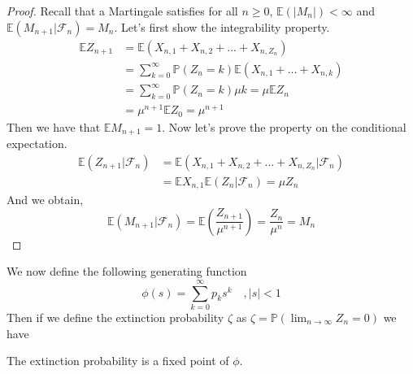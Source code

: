 \begin{proof}
	Recall that a Martingale satisfies for all $n\geq0$, $\mathbb{E}(|M_n|) < \infty$ and $\mathbb{E}(M_{n+1} | \mathcal{F}_n) = M_n$.
	Let's first show the integrability property.
	\begin{align}
		\mathbb{E}Z_{n+1} 	&= \mathbb{E}(X_{n,1} + X_{n,2} + ... + X_{n, Z_n}) \\
					&= \sum_{k=0}^{\infty} \mathbb{P}(Z_n = k)\mathbb{E}(X_{n,1} + ... + X_{n,k})\\
					&= \sum_{k=0}^{\infty} \mathbb{P}(Z_n = k) \mu k = \mu \mathbb{E}Z_n \\
					&= \mu ^{n+1} \mathbb{E} Z_0 = \mu^{n+1}
	\end{align}
	Then we have that $\mathbb{E}M_{n+1} = 1$.
	\newline
	Now let's prove the property on the conditional expectation.
	\begin{align}
		\mathbb{E}(Z_{n+1} | \mathcal{F}_n) 	&= \mathbb{E}( X_{n,1} + X_{n,2} + ... + X_{n, Z_n} | \mathcal{F}_n ) \\
							&= \mathbb{E}X_{n, 1} \mathbb{E}(Z_n |\mathcal{F}_n ) = \mu Z_n
	\end{align}
	And we obtain,
	\begin{equation}
		\mathbb{E}(M_{n+1} | \mathcal{F}_n) = \mathbb{E}(\frac{Z_{n+1}}{\mu^{n+1}}) = \frac{Z_n}{\mu^n} = M_n
	\end{equation}
\end{proof}
We now define the following generating function
\begin{equation}
	\phi(s) = \sum_{k=0}^{\infty} p_k s^k \quad , |s| <1
\end{equation}
Then if we define the extinction probability $\zeta$ as $\zeta = \mathbb{P}(\lim_{n \to \infty} Z_n = 0)$
we have
\begin{theorem}\label{th:ProbExtinction}
	The extinction probability is a fixed point of $\phi$.
\end{theorem}
